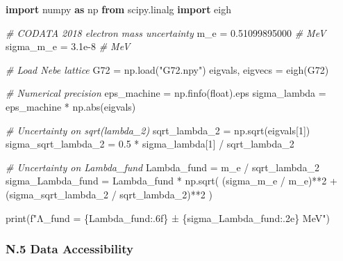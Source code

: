 \documentclass[11pt]{article}
\newenvironment{Shaded}{}{}
\newcommand{\BuiltInTok}[1]{\textcolor[rgb]{0.00,0.50,0.00}{#1}}
\newcommand{\CommentTok}[1]{\textcolor[rgb]{0.38,0.63,0.69}{\textit{#1}}}
\newcommand{\DecValTok}[1]{\textcolor[rgb]{0.25,0.63,0.44}{#1}}
\newcommand{\FloatTok}[1]{\textcolor[rgb]{0.25,0.63,0.44}{#1}}
\newcommand{\ImportTok}[1]{\textcolor[rgb]{0.00,0.50,0.00}{\textbf{#1}}}
\newcommand{\NormalTok}[1]{#1}
\newcommand{\OperatorTok}[1]{\textcolor[rgb]{0.40,0.40,0.40}{#1}}
\newcommand{\SpecialCharTok}[1]{\textcolor[rgb]{0.25,0.44,0.63}{#1}}
\newcommand{\SpecialStringTok}[1]{\textcolor[rgb]{0.73,0.40,0.53}{#1}}
\newcommand{\StringTok}[1]{\textcolor[rgb]{0.25,0.44,0.63}{#1}}
\begin{document}
\begin{Shaded}
\begin{Highlighting}[]
\ImportTok{import}\NormalTok{ numpy }\ImportTok{as}\NormalTok{ np}
\ImportTok{from}\NormalTok{ scipy.linalg }\ImportTok{import}\NormalTok{ eigh}

\CommentTok{\# CODATA 2018 electron mass uncertainty}
\NormalTok{m\_e }\OperatorTok{=} \FloatTok{0.51099895000}  \CommentTok{\# MeV}
\NormalTok{sigma\_m\_e }\OperatorTok{=} \FloatTok{3.1e{-}8}   \CommentTok{\# MeV}

\CommentTok{\# Load Nebe lattice}
\NormalTok{G72 }\OperatorTok{=}\NormalTok{ np.load(}\StringTok{"G72.npy"}\NormalTok{)}
\NormalTok{eigvals, eigvecs }\OperatorTok{=}\NormalTok{ eigh(G72)}

\CommentTok{\# Numerical precision}
\NormalTok{eps\_machine }\OperatorTok{=}\NormalTok{ np.finfo(}\BuiltInTok{float}\NormalTok{).eps}
\NormalTok{sigma\_lambda }\OperatorTok{=}\NormalTok{ eps\_machine }\OperatorTok{*}\NormalTok{ np.}\BuiltInTok{abs}\NormalTok{(eigvals)}

\CommentTok{\# Uncertainty on sqrt(lambda\_2)}
\NormalTok{sqrt\_lambda\_2 }\OperatorTok{=}\NormalTok{ np.sqrt(eigvals[}\DecValTok{1}\NormalTok{])}
\NormalTok{sigma\_sqrt\_lambda\_2 }\OperatorTok{=} \FloatTok{0.5} \OperatorTok{*}\NormalTok{ sigma\_lambda[}\DecValTok{1}\NormalTok{] }\OperatorTok{/}\NormalTok{ sqrt\_lambda\_2}

\CommentTok{\# Uncertainty on Lambda\_fund}
\NormalTok{Lambda\_fund }\OperatorTok{=}\NormalTok{ m\_e }\OperatorTok{/}\NormalTok{ sqrt\_lambda\_2}
\NormalTok{sigma\_Lambda\_fund }\OperatorTok{=}\NormalTok{ Lambda\_fund }\OperatorTok{*}\NormalTok{ np.sqrt(}
\NormalTok{    (sigma\_m\_e }\OperatorTok{/}\NormalTok{ m\_e)}\OperatorTok{**}\DecValTok{2} \OperatorTok{+}\NormalTok{ (sigma\_sqrt\_lambda\_2 }\OperatorTok{/}\NormalTok{ sqrt\_lambda\_2)}\OperatorTok{**}\DecValTok{2}
\NormalTok{)}

\BuiltInTok{print}\NormalTok{(}\SpecialStringTok{f"Λ\_fund = }\SpecialCharTok{\{}\NormalTok{Lambda\_fund}\SpecialCharTok{:.6f\}}\SpecialStringTok{ ± }\SpecialCharTok{\{}\NormalTok{sigma\_Lambda\_fund}\SpecialCharTok{:.2e\}}\SpecialStringTok{ MeV"}\NormalTok{)}
\end{Highlighting}
\end{Shaded}

\hypertarget{n.5-data-accessibility}{%
\subsubsection{N.5 Data Accessibility}\label{n.5-data-accessibility}}
\end{document}
